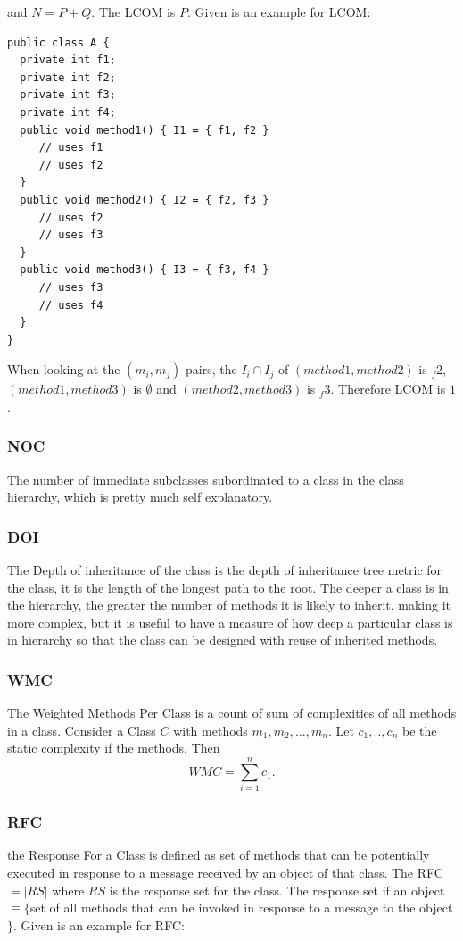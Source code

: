 and $N=P+Q$. The LCOM is $P$. Given is an example for LCOM:

\begin{small}
\begin{verbatim}
public class A {
  private int f1;
  private int f2;
  private int f3;
  private int f4;
  public void method1() { I1 = { f1, f2 }
     // uses f1
     // uses f2
  }
  public void method2() { I2 = { f2, f3 }
     // uses f2
     // uses f3
  }
  public void method3() { I3 = { f3, f4 }
     // uses f3
     // uses f4
  }
}
\end{verbatim}
\end{small}

When looking at the $(m_i,m_j)$ pairs, the $I_i \cap I_j$ of $(method1,method2)$ is $_f2$, $(method1,method3)$ is $\emptyset$ and $(method2,method3)$ is $_f3$. Therefore LCOM is $1$.

\subsubsection{\textbf{NOC}} The number of immediate subclasses subordinated to a class in the class hierarchy, which is pretty much self explanatory.

\subsubsection{\textbf{DOI}} The Depth of inheritance of the class is the depth of inheritance tree metric for the class, it is the length of the longest path to the root. The deeper a class is in the hierarchy, the greater the number of methods it is likely to inherit, making it more
complex, but it is useful to have a measure of how deep a particular class is in hierarchy so that the class can be designed with reuse of inherited methods.

\subsubsection{\textbf{WMC}} The Weighted Methods Per Class is a count of sum of complexities of all methods in a class. Consider a Class $C$ with methods $m_1,m_2,...,m_n$. Let $c_1,..,c_n$ be the static complexity if the methods. Then 
\begin{displaymath}
	WMC = \sum_{i=1}^{n} c_1.
\end{displaymath}

\subsubsection{\textbf{RFC}} the Response For a Class is defined as set of methods that can be potentially executed in response to a message received by an object of that class. The RFC $=|RS|$ where $RS$ is the response set for the class. The response set if an object $\equiv \{$set of all methods that can be invoked in response to a message to the object$\}$. Given is an example for RFC:

